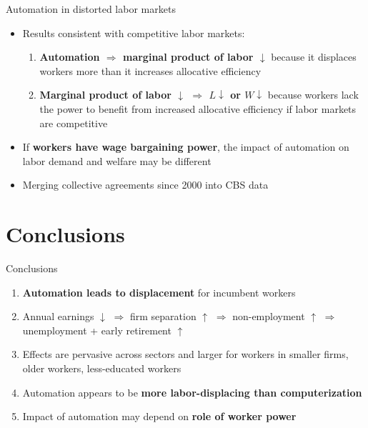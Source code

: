 \documentclass[aspectratio=169]{beamer}
\begin{document}
\begin{frame}{Automation in distorted labor markets} \label{distorted}
\begin{itemize}
\item<1-> Results consistent with competitive labor markets: \bigskip   
  \begin{enumerate}
  \item \textbf{Automation $\Rightarrow$ marginal product of labor $\downarrow$} because it displaces workers more than it increases allocative efficiency \bigskip
  \item \textbf{Marginal product of labor $\downarrow$ $\Rightarrow$ $ L \downarrow$ or $W \downarrow$} because workers lack the power to benefit from increased allocative efficiency if labor markets are competitive \bigskip
  \end{enumerate}
\item<2-> If \textbf{workers have wage bargaining power}, the impact of automation on labor demand and welfare may be different \hyperlink{distorted_model}{} \bigskip
\item<2-> Merging collective agreements since 2000 into CBS data
\end{itemize}
\end{frame}

\section{Conclusions}

\begin{frame}{Conclusions}
\begin{enumerate}
\item<1-> \textbf{Automation leads to displacement} for incumbent workers \bigskip
 \item Annual earnings $\downarrow$ $\Rightarrow$ firm separation $\uparrow$ $\Rightarrow$ non-employment $\uparrow$ $\Rightarrow$ unemployment + early retirement $\uparrow$
\bigskip
\item<2-> Effects are pervasive across sectors and larger for workers in smaller firms, older workers, less-educated workers
\bigskip
\item<3-> Automation appears to be \textbf{more labor-displacing than computerization} \bigskip
\item<4-> Impact of automation may depend on \textbf{role of worker power}
\end{enumerate}
\end{frame}
\end{document}
